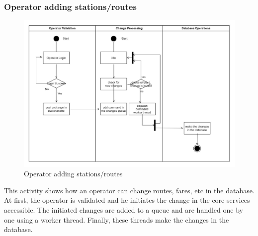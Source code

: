 \documentclass{article}
\begin{document}
 \subsubsection{Operator adding stations/routes}
     \begin{figure}[h]
        \centering
        \includegraphics[scale=0.2]{operator.jpeg}
        \caption{Operator adding stations/routes}
        \label{fig:operator}
    \end{figure}
    This activity shows how an operator can change routes, fares, etc in the database. At first, the operator is validated and he initiates the change in the core services accessible. The initiated changes are added to a queue and are handled one by one using a worker thread. Finally, these threads make the changes in the database. 
\end{document}
